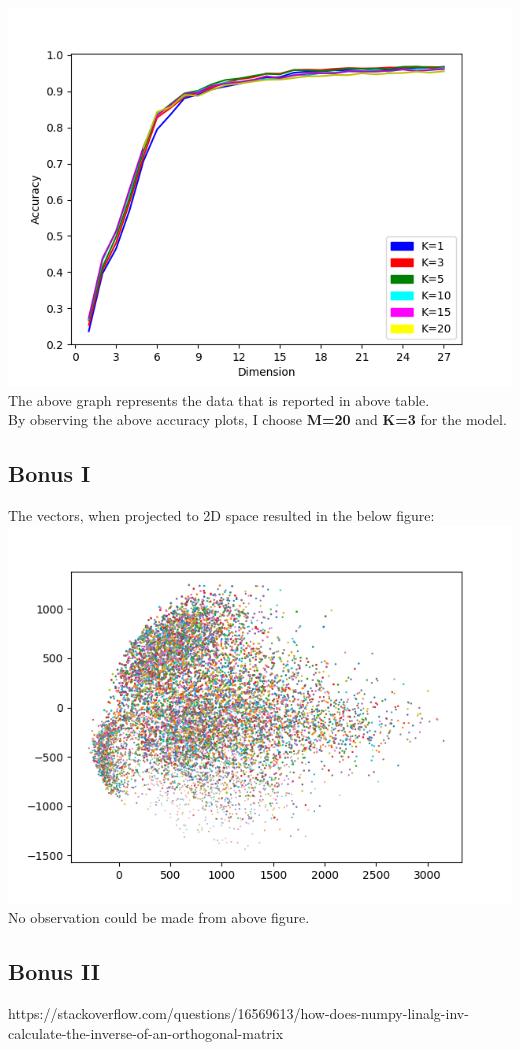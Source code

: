 \documentclass[runningheads]{llncs}
\begin{document}
\includegraphics[scale=0.8]{k-n-accuracy}
The above graph represents the data that is reported in above table.\\
By observing the above accuracy plots, I choose \textbf{M=20} and \textbf{K=3} for the model.

\subsection{Bonus I}
The vectors, when projected to 2D space resulted in the below figure:\\
\includegraphics[scale=0.8]{problem_2_bonus_1}\\
No observation could be made from above figure.

\subsection{Bonus II}

%
%
%
% 
% 
%
\begin{thebibliography}{1}
https://stackoverflow.com/questions/16569613/how-does-numpy-linalg-inv-calculate-the-inverse-of-an-orthogonal-matrix
\end{thebibliography}
\end{document}
